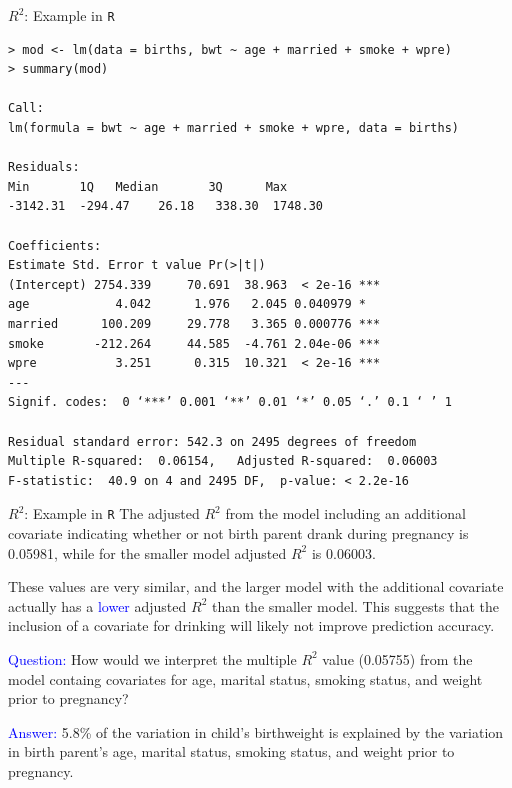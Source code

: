 \documentclass[10pt,t]{beamer}
\begin{document}
\begin{frame}[fragile]{$R^2$: Example in \texttt{R}}
	
		
	\vspace{-8 mm}
	
	
	\footnotesize
\begin{verbatim}
> mod <- lm(data = births, bwt ~ age + married + smoke + wpre)
> summary(mod)

Call:
lm(formula = bwt ~ age + married + smoke + wpre, data = births)

Residuals:
Min       1Q   Median       3Q      Max 
-3142.31  -294.47    26.18   338.30  1748.30 

Coefficients:
Estimate Std. Error t value Pr(>|t|)    
(Intercept) 2754.339     70.691  38.963  < 2e-16 ***
age            4.042      1.976   2.045 0.040979 *  
married      100.209     29.778   3.365 0.000776 ***
smoke       -212.264     44.585  -4.761 2.04e-06 ***
wpre           3.251      0.315  10.321  < 2e-16 ***
---
Signif. codes:  0 ‘***’ 0.001 ‘**’ 0.01 ‘*’ 0.05 ‘.’ 0.1 ‘ ’ 1

Residual standard error: 542.3 on 2495 degrees of freedom
Multiple R-squared:  0.06154,	Adjusted R-squared:  0.06003 
F-statistic:  40.9 on 4 and 2495 DF,  p-value: < 2.2e-16
\end{verbatim}
\end{frame}



\begin{frame}{$R^2$: Example in \texttt{R}}
The adjusted $R^2$ from the model including an additional covariate indicating whether or not birth parent drank during pregnancy is 0.05981, while for the smaller model adjusted $R^2$ is 0.06003. 

\bigskip
These values are very similar, and the larger model with the additional covariate actually has a  \textcolor{blue}{lower} adjusted $R^2$ than the smaller model. This suggests that the inclusion of a covariate for drinking will likely not improve prediction accuracy.  

\vspace{0.3cm}

\textcolor{blue}{Question:} How would we interpret the multiple $R^2$ value (0.05755) from the model containg covariates for age, marital status, smoking status, and weight prior to pregnancy?  

\vspace{0.3cm}

\textcolor{blue}{Answer:} 5.8\% of the variation in child's birthweight is explained by the variation in birth parent's age, marital status, smoking status, and weight prior to pregnancy. 

\end{frame}
\end{document}
